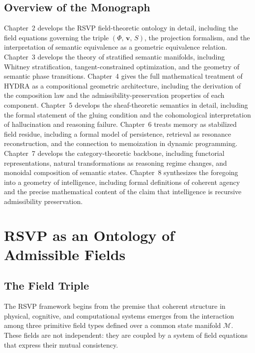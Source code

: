 \documentclass[12pt, a4paper, openany]{book}
\theoremstyle{plain}
\theoremstyle{definition}
\theoremstyle{remark}
\newcommand{\vvec}{\mathbf{v}}
\newcommand{\Sfield}{S}
\newcommand{\RSVPtriple}{(\Phi,\,\vvec,\,\Sfield)}
\begin{document}
\section{Overview of the Monograph}

Chapter~2 develops the RSVP field-theoretic ontology in detail, including the field equations governing the triple $\RSVPtriple$, the projection formalism, and the interpretation of semantic equivalence as a geometric equivalence relation. Chapter~3 develops the theory of stratified semantic manifolds, including Whitney stratification, tangent-constrained optimization, and the geometry of semantic phase transitions. Chapter~4 gives the full mathematical treatment of HYDRA as a compositional geometric architecture, including the derivation of the composition law and the admissibility-preservation properties of each component. Chapter~5 develops the sheaf-theoretic semantics in detail, including the formal statement of the gluing condition and the cohomological interpretation of hallucination and reasoning failure. Chapter~6 treats memory as stabilized field residue, including a formal model of persistence, retrieval as resonance reconstruction, and the connection to memoization in dynamic programming. Chapter~7 develops the category-theoretic backbone, including functorial representations, natural transformations as reasoning regime changes, and monoidal composition of semantic states. Chapter~8 synthesizes the foregoing into a geometry of intelligence, including formal definitions of coherent agency and the precise mathematical content of the claim that intelligence is recursive admissibility preservation.

\chapter{RSVP as an Ontology of Admissible Fields}

\section{The Field Triple}

The RSVP framework begins from the premise that coherent structure in physical, cognitive, and computational systems emerges from the interaction among three primitive field types defined over a common state manifold $\mathcal{M}$. These fields are not independent: they are coupled by a system of field equations that express their mutual consistency.
\end{document}
